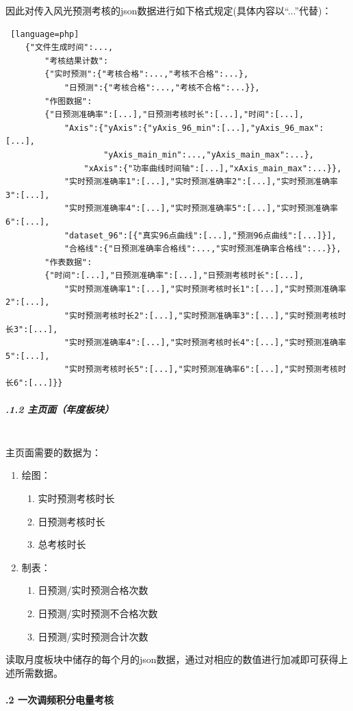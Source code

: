 \documentclass[winfonts,UTF8,a4paper]{ctexart}
\begin{document}
因此对传入风光预测考核的json数据进行如下格式规定(具体内容以“...”代替)：
\begin{lstlisting} [language=php]
	{"文件生成时间":...,
		"考核结果计数":
		{"实时预测":{"考核合格":...,"考核不合格":...},
			"日预测":{"考核合格":...,"考核不合格":...}},
		"作图数据":
		{"日预测准确率":[...],"日预测考核时长":[...],"时间":[...],
			"Axis":{"yAxis":{"yAxis_96_min":[...],"yAxis_96_max":[...],
					"yAxis_main_min":...,"yAxis_main_max":...},
				"xAxis":{"功率曲线时间轴":[...],"xAxis_main_max":...}},
			"实时预测准确率1":[...],"实时预测准确率2":[...],"实时预测准确率3":[...],
			"实时预测准确率4":[...],"实时预测准确率5":[...],"实时预测准确率6":[...],
			"dataset_96":[{"真实96点曲线":[...],"预测96点曲线":[...]}],
			"合格线":{"日预测准确率合格线":...,"实时预测准确率合格线":...}},
		"作表数据":
		{"时间":[...],"日预测准确率":[...],"日预测考核时长":[...],
			"实时预测准确率1":[...],"实时预测考核时长1":[...],"实时预测准确率2":[...],
			"实时预测考核时长2":[...],"实时预测准确率3":[...],"实时预测考核时长3":[...],
			"实时预测准确率4":[...],"实时预测考核时长4":[...],"实时预测准确率5":[...],
			"实时预测考核时长5":[...],"实时预测准确率6":[...],"实时预测考核时长6":[...]}}
\end{lstlisting}
\subparagraph{\thesubsubsection.1.2 主页面（年度板块）}\ \\
主页面需要的数据为：
\begin{enumerate}
	\item 绘图：
	\begin{enumerate}
		\item 实时预测考核时长
		\item 	日预测考核时长
		\item 	总考核时长
	\end{enumerate}
	\item 制表：
	\begin{enumerate}
		\item 日预测/实时预测合格次数
		\item 	日预测/实时预测不合格次数
		\item 	日预测/实时预测合计次数
	\end{enumerate}
\end{enumerate}

读取月度板块中储存的每个月的json数据，通过对相应的数值进行加减即可获得上述所需数据。
\paragraph{\thesubsubsection.2 一次调频积分电量考核}\label{Pjsonmonth}
\end{document}
